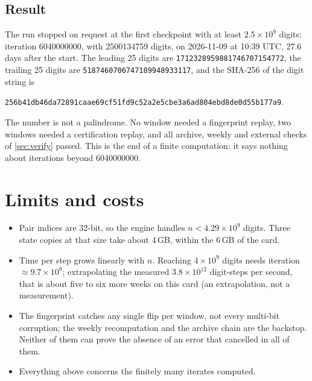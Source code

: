 \documentclass[11pt,a4paper]{article}
\newcommand{\code}[1]{\texttt{\small #1}}
\theoremstyle{remark}
\begin{document}
\subsection{Result}
The run stopped on request at the first checkpoint with at least $2.5\times10^9$ digits: iteration \num{6040000000}, with \num{2500134759} digits, on 2026-11-09 at 10:39 UTC, 27.6 days after the start. The leading 25 digits are \code{1712328959881746707154772}, the trailing 25 digits are \code{5187460706747189948933117}, and the SHA-256 of the digit string is
\begin{center}\code{256b41db46da72891caae69cf51fd9c52a2e5cbe3a6ad804ebd8de0d55b177a9}.\end{center}
The number is not a palindrome. No window needed a fingerprint replay, two windows needed a certification replay, and all archive, weekly and external checks of \cref{sec:verify} passed. This is the end of a finite computation: it says nothing about iterations beyond \num{6040000000}.

\section{Limits and costs}\label{sec:limits}
\begin{itemize}
\item Pair indices are 32-bit, so the engine handles $n<4.29\times10^9$ digits. Three state copies at that size take about 4\,GB, within the 6\,GB of the card.
\item Time per step grows linearly with $n$. Reaching $4\times10^9$ digits needs iteration $\approx9.7\times10^9$; extrapolating the measured $3.8\times10^{12}$ digit-steps per second, that is about five to six more weeks on this card (an extrapolation, not a measurement).
\item The fingerprint catches any single flip per window, not every multi-bit corruption; the weekly recomputation and the archive chain are the backstop. Neither of them can prove the absence of an error that cancelled in all of them.
\item Everything above concerns the finitely many iterates computed.
\end{itemize}
\end{document}
